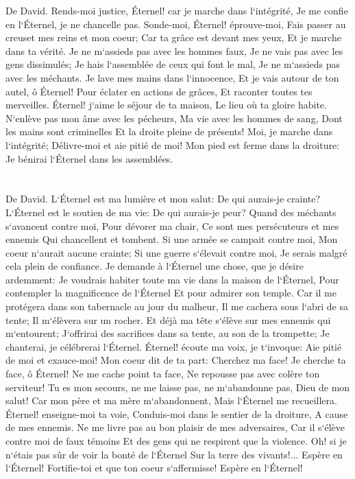 \verse De David. Rends-moi justice, Éternel! car je marche dans l`intégrité, Je me confie en l`Éternel, je ne chancelle pas. 
\verse Sonde-moi, Éternel! éprouve-moi, Fais passer au creuset mes reins et mon coeur; 
\verse Car ta grâce est devant mes yeux, Et je marche dans ta vérité. 
\verse Je ne m`assieds pas avec les hommes faux, Je ne vais pas avec les gens dissimulés; 
\verse Je hais l`assemblée de ceux qui font le mal, Je ne m`assieds pas avec les méchants. 
\verse Je lave mes mains dans l`innocence, Et je vais autour de ton autel, ô Éternel! 
\verse Pour éclater en actions de grâces, Et raconter toutes tes merveilles. 
\verse Éternel! j`aime le séjour de ta maison, Le lieu où ta gloire habite. 
\verse N`enlève pas mon âme avec les pécheurs, Ma vie avec les hommes de sang, 
\verse Dont les mains sont criminelles Et la droite pleine de présents! 
\verse Moi, je marche dans l`intégrité; Délivre-moi et aie pitié de moi! 
\verse Mon pied est ferme dans la droiture: Je bénirai l`Éternel dans les assemblées. 

\chapter{}

\verse De David. L`Éternel est ma lumière et mon salut: De qui aurais-je crainte? L`Éternel est le soutien de ma vie: De qui aurais-je peur? 
\verse Quand des méchants s`avancent contre moi, Pour dévorer ma chair, Ce sont mes persécuteurs et mes ennemis Qui chancellent et tombent. 
\verse Si une armée se campait contre moi, Mon coeur n`aurait aucune crainte; Si une guerre s`élevait contre moi, Je serais malgré cela plein de confiance. 
\verse Je demande à l`Éternel une chose, que je désire ardemment: Je voudrais habiter toute ma vie dans la maison de l`Éternel, Pour contempler la magnificence de l`Éternel Et pour admirer son temple. 
\verse Car il me protégera dans son tabernacle au jour du malheur, Il me cachera sous l`abri de sa tente; Il m`élèvera sur un rocher. 
\verse Et déjà ma tête s`élève sur mes ennemis qui m`entourent; J`offrirai des sacrifices dans sa tente, au son de la trompette; Je chanterai, je célébrerai l`Éternel. 
\verse Éternel! écoute ma voix, je t`invoque: Aie pitié de moi et exauce-moi! 
\verse Mon coeur dit de ta part: Cherchez ma face! Je cherche ta face, ô Éternel! 
\verse Ne me cache point ta face, Ne repousse pas avec colère ton serviteur! Tu es mon secours, ne me laisse pas, ne m`abandonne pas, Dieu de mon salut! 
\verse Car mon père et ma mère m`abandonnent, Mais l`Éternel me recueillera. 
\verse Éternel! enseigne-moi ta voie, Conduis-moi dans le sentier de la droiture, A cause de mes ennemis. 
\verse Ne me livre pas au bon plaisir de mes adversaires, Car il s`élève contre moi de faux témoins Et des gens qui ne respirent que la violence. 
\verse Oh! si je n`étais pas sûr de voir la bonté de l`Éternel Sur la terre des vivants!... 
\verse Espère en l`Éternel! Fortifie-toi et que ton coeur s`affermisse! Espère en l`Éternel! 

